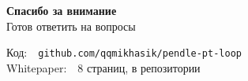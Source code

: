 \documentclass[11pt,aspectratio=169]{beamer}
\begin{document}
\begin{frame}[plain]
  \centering
  \vspace{1.5cm}
  {\LARGE \textbf{Спасибо за внимание}}\\[2em]
  {\Large Готов ответить на вопросы}

  \vspace{2cm}
  {\footnotesize
  \color{soft}
  Код:~~\texttt{github.com/qqmikhasik/pendle-pt-loop}\\
  Whitepaper:~~8 страниц, в репозитории}
\end{frame}
\end{document}

